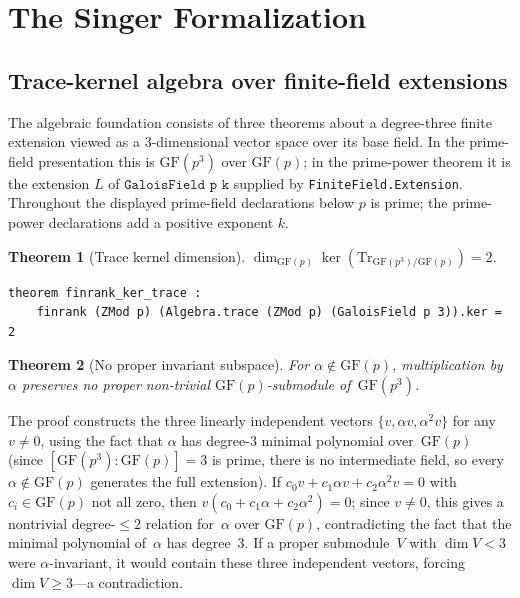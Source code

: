 \documentclass[11pt,a4paper]{article}
\newtheorem{theorem}{Theorem}[section]
\begin{document}
\section{The Singer Formalization}
\label{sec:singer}

\subsection{Trace-kernel algebra over finite-field extensions}

The algebraic foundation consists of three theorems about a degree-three finite
extension viewed as a 3-dimensional vector space over its base field.  In the
prime-field presentation this is \(\mathrm{GF}(p^3)\) over \(\mathrm{GF}(p)\);
in the prime-power theorem it is the extension \(L\) of
\(\texttt{GaloisField p k}\) supplied by \texttt{FiniteField.Extension}.
Throughout the displayed prime-field declarations below \(p\) is prime; the
prime-power declarations add a positive exponent \(k\).

\begin{theorem}[Trace kernel dimension]
\label{thm:finrank-ker}
$\dim_{\mathrm{GF}(p)} \ker(\mathrm{Tr}_{\mathrm{GF}(p^3)/\mathrm{GF}(p)}) = 2$.
\end{theorem}

\begin{lstlisting}
theorem finrank_ker_trace :
    finrank (ZMod p) (Algebra.trace (ZMod p) (GaloisField p 3)).ker = 2
\end{lstlisting}

\begin{theorem}[No proper invariant subspace]
\label{thm:no-invariant}
For $\alpha \notin \mathrm{GF}(p)$, multiplication by~$\alpha$ preserves no
proper non-trivial $\mathrm{GF}(p)$-submodule of\/~$\mathrm{GF}(p^3)$.
\end{theorem}

The proof constructs the three linearly independent vectors
$\{v, \alpha v, \alpha^2 v\}$ for any $v \ne 0$, using the fact that
$\alpha$ has degree-3 minimal polynomial over~$\mathrm{GF}(p)$ (since
$[\mathrm{GF}(p^3):\mathrm{GF}(p)] = 3$ is prime, there is no intermediate
field, so every $\alpha \notin \mathrm{GF}(p)$ generates the full extension).
If $c_0 v + c_1 \alpha v + c_2 \alpha^2 v = 0$ with $c_i \in \mathrm{GF}(p)$
not all zero, then $v(c_0 + c_1\alpha + c_2\alpha^2) = 0$; since $v \ne 0$,
this gives a nontrivial degree-$\le 2$ relation for~$\alpha$
over $\mathrm{GF}(p)$, contradicting the fact that the minimal polynomial
of~$\alpha$ has degree~$3$.
If a proper submodule~$V$ with $\dim V < 3$ were $\alpha$-invariant, it
would contain these three independent vectors, forcing $\dim V \ge 3$---a
contradiction.
\end{document}
